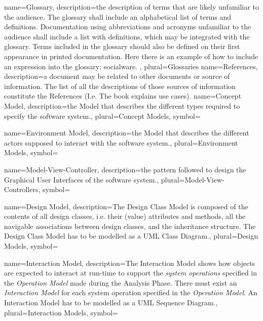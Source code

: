 {name={Glossary},
description={the description of terms that are
likely unfamiliar to the audience. The glossary shall include an alphabetical list of
terms and definitions. Documentation using abbreviations and acronyms unfamiliar
to the audience shall include a list with definitions, which may be integrated
with the glossary. Terms included in the glossary should also be defined on
their first appearance in printed documentation. Here there is an example of how
to include an expression into the glossary: \gls{socialware}. 
}, 
plural={Glossaries}
}
{name={References},
description={a document may be related to other documents or source of information. The list of all the descriptions of those sources of information constitute the References (I.e. The book \cite{armour01usecase}explains use cases). 
}
}
{name={Concept Model},
description={the Model that describes the different types required to specify
the software system.}, 
plural={Concept Models},
symbol={}
}

{name={Environment Model},
description={the Model that describes the different actors supposed to interact
with the software system.}, 
plural={Environment Models},
symbol={}
}

{name={Model-View-Controller},
description={the pattern followed to design the Graphical User Interfaces
of the software system.}, 
plural={Model-View-Controllers}, 
symbol={}
}


{name={Design Model},
description={The Design Class Model is composed of the contents of all design classes, i.e.
their (value) attributes and methods, all the navigable associations between
design classes, and the inheritance structure. The Design Class Model has to be
modelled as a UML Class Diagram.}, 
plural={Design Models}, 
symbol={}
}


{name={Interaction Model},
description={The Interaction Model shows how objects are expected to interact at run-time to
support the \emph{system operations} specified in the \emph{Operation Model}
made during the Analysis Phase. There must exist an \emph{Interaction Model} for
each system operation specified in the \emph{Operation Model}. An Interaction Model has to be
modelled as a UML Sequence Diagram.}, 
plural={Interaction Models}, 
symbol={}
}

